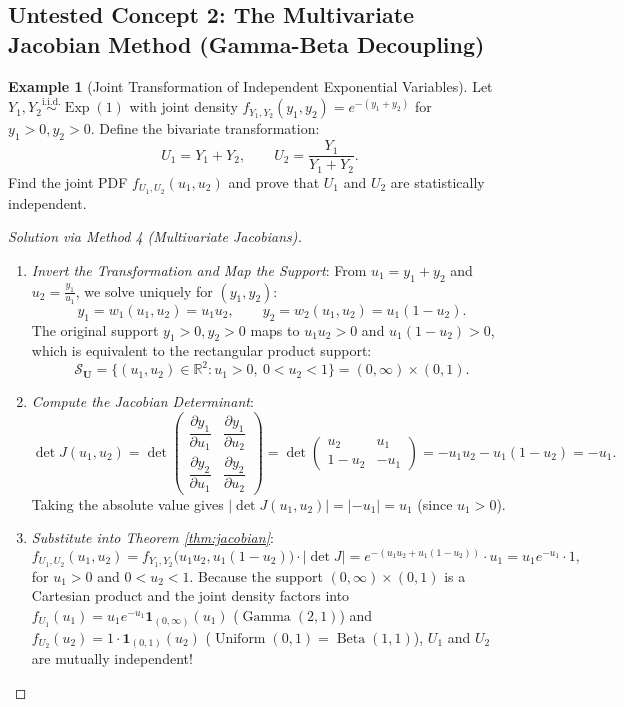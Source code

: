 \documentclass[11pt, letterpaper]{article}
\theoremstyle{definition}
\newtheorem{example}{Example}[section]
\theoremstyle{remark}
\newcommand{\R}{\mathbb{R}}
\begin{document}
\begin{itemize}
\subsection{Untested Concept 2: The Multivariate Jacobian Method (Gamma-Beta Decoupling)}

\begin{example}[Joint Transformation of Independent Exponential Variables]
Let $Y_1, Y_2 \stackrel{\text{i.i.d.}}{\sim} \operatorname{Exp}(1)$ with joint density $f_{Y_1, Y_2}(y_1, y_2) = e^{-(y_1 + y_2)}$ for $y_1 > 0, y_2 > 0$. Define the bivariate transformation:
\[
    U_1 = Y_1 + Y_2, \qquad U_2 = \frac{Y_1}{Y_1 + Y_2}.
\]
Find the joint PDF $f_{U_1, U_2}(u_1, u_2)$ and prove that $U_1$ and $U_2$ are statistically independent.
\end{example}

\begin{proof}[Solution via Method 4 (Multivariate Jacobians)]
\begin{enumerate}[label=\textbf{Step \arabic*:}]
    \item \textit{Invert the Transformation and Map the Support}: From $u_1 = y_1 + y_2$ and $u_2 = \frac{y_1}{u_1}$, we solve uniquely for $(y_1, y_2)$:
    \[
        y_1 = w_1(u_1, u_2) = u_1 u_2, \qquad y_2 = w_2(u_1, u_2) = u_1(1 - u_2).
    \]
    The original support $y_1 > 0, y_2 > 0$ maps to $u_1 u_2 > 0$ and $u_1(1 - u_2) > 0$, which is equivalent to the rectangular product support:
    \[
        \mathcal{S}_{\mathbf{U}} = \{(u_1, u_2) \in \R^2 : u_1 > 0, \ 0 < u_2 < 1\} = (0, \infty) \times (0, 1).
    \]
    \item \textit{Compute the Jacobian Determinant}:
    \[
        \det J(u_1, u_2) = \det \begin{pmatrix} \dfrac{\partial y_1}{\partial u_1} & \dfrac{\partial y_1}{\partial u_2} \\[10pt] \dfrac{\partial y_2}{\partial u_1} & \dfrac{\partial y_2}{\partial u_2} \end{pmatrix} = \det \begin{pmatrix} u_2 & u_1 \\ 1 - u_2 & -u_1 \end{pmatrix} = -u_1 u_2 - u_1(1 - u_2) = -u_1.
    \]
    Taking the absolute value gives $|\det J(u_1, u_2)| = |-u_1| = u_1$ (since $u_1 > 0$).
    \item \textit{Substitute into Theorem \ref{thm:jacobian}}:
    \[
        f_{U_1, U_2}(u_1, u_2) = f_{Y_1, Y_2}\big(u_1 u_2, u_1(1 - u_2)\big) \cdot |\det J| = e^{-(u_1 u_2 + u_1(1 - u_2))} \cdot u_1 = u_1 e^{-u_1} \cdot 1,
    \]
    for $u_1 > 0$ and $0 < u_2 < 1$. Because the support $(0, \infty) \times (0, 1)$ is a Cartesian product and the joint density factors into $f_{U_1}(u_1) = u_1 e^{-u_1} \mathbf{1}_{(0,\infty)}(u_1)$ ($\operatorname{Gamma}(2,1)$) and $f_{U_2}(u_2) = 1 \cdot \mathbf{1}_{(0,1)}(u_2)$ ($\operatorname{Uniform}(0,1) = \operatorname{Beta}(1,1)$), $U_1$ and $U_2$ are mutually independent!
\end{enumerate}
\end{proof}


\end{itemize}
\end{document}
